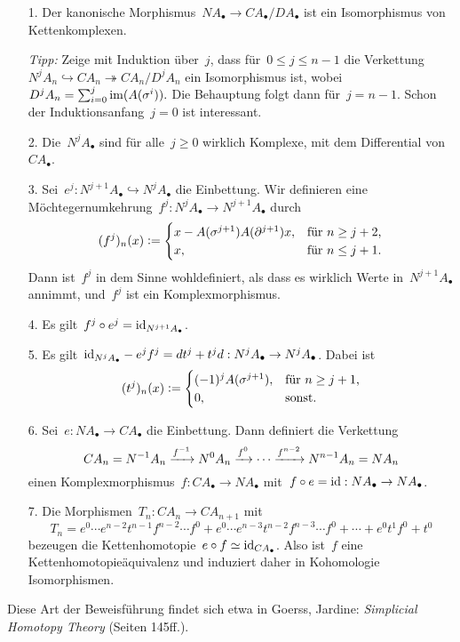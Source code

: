 \documentclass{uebblatt}
\begin{document}
\begin{enumerate}
\item[1.] Der kanonische Morphismus~$NA_\bullet \to CA_\bullet/DA_\bullet$ ist
ein Isomorphismus von Kettenkomplexen.

\emph{Tipp:} Zeige mit Induktion über~$j$, dass für~$0 \leq j \leq n-1$ die
Verkettung~$N^j A_n \hookrightarrow CA_n \twoheadrightarrow CA_n/D^jA_n$ ein
Isomorphismus ist, wobei~$D^j A_n = \sum_{i=0}^j \operatorname{im}(A(\sigma^i)).$
Die Behauptung folgt dann für~$j = n-1$. Schon der Induktionsanfang~$j = 0$ ist
interessant.

\item[2.] Die~$N^j A_\bullet$ sind für alle~$j \geq 0$ wirklich Komplexe, mit
dem Differential von~$CA_\bullet$.

\item[3.] Sei~$e^j : N^{j+1}A_\bullet \hookrightarrow N^jA_\bullet$ die
Einbettung. Wir definieren eine Möchtegernumkehrung~$f^j : N^jA_\bullet \to
N^{j+1}A_\bullet$ durch
\[ (f^j)_n(x) \vcentcolon= \begin{cases}
  x - A(\sigma^{j+1}) A(\partial^{j+1})x, &
  \text{für $n \geq j+2$,} \\
  x, & \text{für $n \leq j+1$}. \end{cases} \]
Dann ist~$f^j$ in dem Sinne wohldefiniert, als dass es wirklich Werte
in~$N^{j+1}A_\bullet$ annimmt, und~$f^j$ ist ein Komplexmorphismus.

\item[4.] Es gilt~$f^j \circ e^j = \mathrm{id}_{N^{j+1}A_\bullet}$.

\item[5.] Es gilt~$\mathrm{id}_{N^jA_\bullet} - e^j f^j = d t^j + t^j d : N^jA_\bullet \to
N^jA_\bullet$. Dabei ist
\[ (t^j)_n(x) \vcentcolon= \begin{cases}
  (-1)^j A(\sigma^{j+1}), & \text{für $n \geq j+1$,} \\
  0, & \text{sonst.} \end{cases} \]

\item[6.] Sei~$e : NA_\bullet \to CA_\bullet$ die Einbettung. Dann definiert
die Verkettung
\[ CA_n = N^{-1}A_n \xrightarrow{f^{-1}} N^0A_n \xrightarrow{f^0} \cdots \xrightarrow{f^{n-2}} N^{n-1}A_n =
NA_n \]
einen Komplexmorphismus~$f : CA_\bullet \to NA_\bullet$ mit~$f \circ e = \mathrm{id} :
NA_\bullet \to NA_\bullet$.

\item[7.] Die Morphismen~$T_n : CA_n \to CA_{n+1}$ mit
\[ T_n = e^0 \cdots e^{n-2} t^{n-1} f^{n-2} \cdots f^0 +
  e^0 \cdots e^{n-3} t^{n-2} f^{n-3} \cdots f^0 + \cdots +
  e^0 t^1 f^0 + t^0 \]
bezeugen die Kettenhomotopie~$e \circ f \simeq \mathrm{id}_{CA_\bullet}$. Also ist~$f$
eine Kettenhomotopieäquivalenz und induziert daher in Kohomologie
Isomorphismen.
\end{enumerate}

Diese Art der Beweisführung findet sich etwa in Goerss, Jardine:
\emph{Simplicial Homotopy Theory} (Seiten 145ff.).
\end{document}
